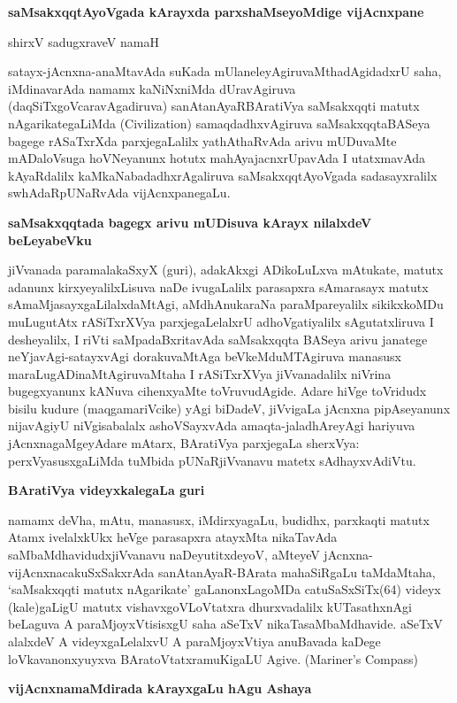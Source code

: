 \noindent
\textbf{saMsakxqqtAyoVgada kArayxda parxshaMseyoMdige vijAcnxpane}\label{page21}

\begin{center}
shirxV sadugxraveV namaH
\end{center}

satayx-jAcnxna-anaMtavAda suKada mUlaneleyAgiruvaMthadAgidadxrU saha, iMdinavarAda namamx kaNiNxniMda dUravAgiruva (daqSiTxgoVcaravAgadiruva) sanAtanAyaRBAratiVya saMsakxqqti matutx nAgarikategaLiMda {\rm (Civilization)} samaqdadhxvAgiruva saMsakxqqtaBASeya bagege rASaTxrXda parxjegaLalilx yathAthaRvAda arivu mUDuvaMte mADaloVsuga hoVNeyanunx hotutx mahAyajacnxrUpavAda I utatxmavAda kAyaRdalilx kaMkaNabadadhxrAgaliruva saMsakxqqtAyoVgada sadasayxralilx swhAdaRpUNaRvAda vijAcnxpanegaLu.

\noindent
\textbf{saMsakxqqtada bagegx arivu mUDisuva kArayx nilalxdeV beLeyabeVku}\label{page21}

jiVvanada paramalakaSxyX (guri), adakAkxgi ADikoLuLxva mAtukate, matutx adanunx kirxyeyalilxLisuva naDe ivugaLalilx parasapxra sAmarasayx matutx sAmaMjasayxgaLilalxdaMtAgi, aMdhAnukaraNa paraMpareyalilx sikikxkoMDu muLugutAtx rASiTxrXVya parxjegaLelalxrU adhoVgatiyalilx sAgutatxliruva I desheyalilx, I riVti saMpadaBxritavAda saMsakxqqta BASeya arivu janatege neYjavAgi-satayxvAgi dorakuvaMtAga beVkeMduMTAgiruva manasusx maraLugADinaMtAgiruvaMtaha I rASiTxrXVya jiVvanadalilx niVrina bugegxyanunx kANuva cihenxyaMte toVruvudAgide. Adare hiVge toVridudx bisilu kudure (maqgamariVcike) yAgi biDadeV, jiVvigaLa jAcnxna pipAseyanunx nijavAgiyU niVgisabalalx ashoVSayxvAda amaqta-jaladhAreyAgi hariyuva jAcnxnagaMgeyAdare mAtarx, BAratiVya parxjegaLa sherxVya: perxVyasusxgaLiMda tuMbida pUNaRjiVvanavu matetx sAdhayxvAdiVtu.

\noindent
\textbf{BAratiVya videyxkalegaLa guri}\label{page22}

namamx deVha, mAtu, manasusx, iMdirxyagaLu, budidhx, parxkaqti matutx Atamx ivelalxkUkx heVge parasapxra atayxMta nikaTavAda saMbaMdhavidudxjiVvanavu naDeyutitxdeyoV, aMteyeV jAcnxna-vijAcnxnacakuSxSakxrAda sanAtanAyaR-BArata mahaSiRgaLu taMdaMtaha, `saMsakxqqti matutx nAgarikate' gaLanonxLagoMDa catuSaSxSiTx(64) videyx (kale)gaLigU matutx vishavxgoVLoVtatxra dhurxvadalilx kUTasathxnAgi beLaguva A paraMjoyxVtisisxgU saha aSeTxV nikaTasaMbaMdhavide. aSeTxV
alalxdeV A videyxgaLelalxvU A paraMjoyxVtiya anuBavada kaDege loVkavanonxyuyxva BAratoVtatxramuKigaLU Agive. {(\rm Mariner's Compass)}

\noindent
\textbf{vijAcnxnamaMdirada kArayxgaLu hAgu Ashaya}\label{page22}

